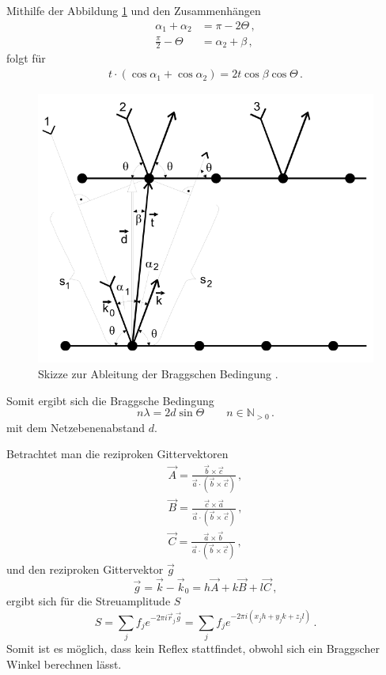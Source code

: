 Mithilfe der Abbildung \ref{fig:bragg} und den Zusammenhängen
\begin{align*}
    \alpha_1 + \alpha_2 &= \pi - 2 \Theta\,,\\
    \frac{\pi}{2} - \Theta &= \alpha_2 + \beta\,,
\end{align*}
folgt für
\begin{align*}
    t \cdot \left(\cos{\alpha_1} + \cos{\alpha_2}\right) = 2 t \cos{\beta} \cos{\Theta}\,.
\end{align*}
\begin{figure}[h!]
    \centering
    \includegraphics[width=0.5\linewidth]{images/bragg.png}
    \caption{Skizze zur Ableitung der Braggschen Bedingung \cite{V41}.}
    \label{fig:bragg}
\end{figure}

Somit ergibt sich die Braggsche Bedingung
\begin{equation*}
    n\lambda = 2 d \sin{\Theta} \qquad n \in \mathbb{N}_{>0}\,.
\end{equation*}
mit dem Netzebenenabstand $d$.

Betrachtet man die reziproken Gittervektoren
\begin{align*}
    \vec{A} = \frac{\vec{b} \times \vec{c}}{\vec{a}\cdot\left(\vec{b} \times \vec{c}\right)}\,,\\
    \vec{B} = \frac{\vec{c} \times \vec{a}}{\vec{a}\cdot\left(\vec{b} \times \vec{c}\right)}\,,\\
    \vec{C} = \frac{\vec{a} \times \vec{b}}{\vec{a}\cdot\left(\vec{b} \times \vec{c}\right)}\,,
\end{align*}
und den reziproken Gittervektor $\vec{g}$
\begin{equation*}
    \vec{g} = \vec{k} - \vec{k}_0 = h\vec{A} + k\vec{B} + l\vec{C}\,,
\end{equation*}
ergibt sich für die Streuamplitude $S$
\begin{equation*}
    S = \sum_j f_j e^{-2 \pi i \vec{r}_j \vec{g}} = \sum_j f_j e^{-2 \pi i \left(x_j h + y_j k + z_j l\right)}\,.
\end{equation*}
Somit ist es möglich, dass kein Reflex stattfindet, obwohl sich ein Braggscher Winkel berechnen lässt.


